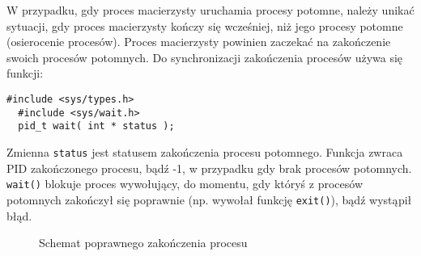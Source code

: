 W przypadku, gdy proces macierzysty uruchamia procesy potomne, należy unikać
sytuacji, gdy proces macierzysty kończy się wcześniej, niż jego procesy potomne
(osierocenie procesów). Proces macierzysty powinien zaczekać na zakończenie
swoich procesów potomnych. Do synchronizacji zakończenia procesów używa się
funkcji:


\begin{lstlisting}[style=MyCStyle]
  #include <sys/types.h>
  #include <sys/wait.h>
  pid_t wait( int * status );
\end{lstlisting}

Zmienna \texttt{status} jest statusem zakończenia procesu potomnego. Funkcja
zwraca PID zakończonego procesu, bądź -1, w przypadku gdy brak procesów
potomnych. \texttt{wait()} blokuje proces wywołujący, do momentu, gdy któryś z procesów
potomnych zakończył się poprawnie (np. wywołał funkcję \texttt{exit()}), bądź
wystąpił błąd.

\begin{figure}
  \centering
  \caption{Schemat poprawnego zakończenia procesu}
  \label{fig:Z6B8G}
\end{figure}

